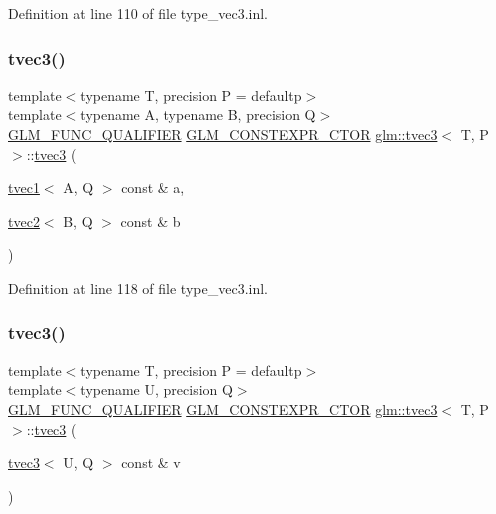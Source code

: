 Definition at line 110 of file type\+\_\+vec3.\+inl.

\mbox{\label{structglm_1_1tvec3_a64c26f79c83220322f8bdcab744dc033}} 
\subsubsection{\texorpdfstring{tvec3()}{tvec3()}\hspace{0.1cm}{\footnotesize\ttfamily [21/23]}}
{\footnotesize\ttfamily template$<$typename T, precision P = defaultp$>$ \\
template$<$typename A, typename B, precision Q$>$ \\
\mbox{\hyperlink{setup_8hpp_a33fdea6f91c5f834105f7415e2a64407}{G\+L\+M\+\_\+\+F\+U\+N\+C\+\_\+\+Q\+U\+A\+L\+I\+F\+I\+ER}} \mbox{\hyperlink{setup_8hpp_ad34178a09666081abdb573c14d1f4a5a}{G\+L\+M\+\_\+\+C\+O\+N\+S\+T\+E\+X\+P\+R\+\_\+\+C\+T\+OR}} \mbox{\hyperlink{structglm_1_1tvec3}{glm\+::tvec3}}$<$ T, P $>$\+::\mbox{\hyperlink{structglm_1_1tvec3}{tvec3}} (\begin{DoxyParamCaption}\item[{\mbox{\hyperlink{structglm_1_1tvec1}{tvec1}}$<$ A, Q $>$ const \&}]{a,  }\item[{\mbox{\hyperlink{structglm_1_1tvec2}{tvec2}}$<$ B, Q $>$ const \&}]{b }\end{DoxyParamCaption})}



Definition at line 118 of file type\+\_\+vec3.\+inl.

\mbox{\label{structglm_1_1tvec3_a1366e758df5526833c39e492b07a026c}} 
\subsubsection{\texorpdfstring{tvec3()}{tvec3()}\hspace{0.1cm}{\footnotesize\ttfamily [22/23]}}
{\footnotesize\ttfamily template$<$typename T, precision P = defaultp$>$ \\
template$<$typename U, precision Q$>$ \\
\mbox{\hyperlink{setup_8hpp_a33fdea6f91c5f834105f7415e2a64407}{G\+L\+M\+\_\+\+F\+U\+N\+C\+\_\+\+Q\+U\+A\+L\+I\+F\+I\+ER}} \mbox{\hyperlink{setup_8hpp_ad34178a09666081abdb573c14d1f4a5a}{G\+L\+M\+\_\+\+C\+O\+N\+S\+T\+E\+X\+P\+R\+\_\+\+C\+T\+OR}} \mbox{\hyperlink{structglm_1_1tvec3}{glm\+::tvec3}}$<$ T, P $>$\+::\mbox{\hyperlink{structglm_1_1tvec3}{tvec3}} (\begin{DoxyParamCaption}\item[{\mbox{\hyperlink{structglm_1_1tvec3}{tvec3}}$<$ U, Q $>$ const \&}]{v }\end{DoxyParamCaption})}




